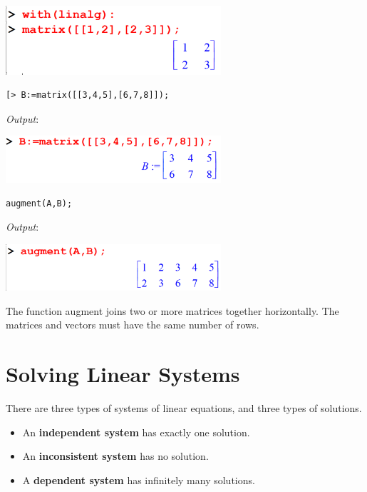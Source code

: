 \documentclass[
]{book}
\providecommand{\tightlist}{%
  \setlength{\itemsep}{0pt}\setlength{\parskip}{0pt}}
\theoremstyle{definition}
\theoremstyle{definition}
\theoremstyle{definition}
\theoremstyle{definition}
\theoremstyle{remark}
\begin{document}
\includegraphics[width=0.6\textwidth,height=\textheight]{figures/Lesson 5/fig1.png}

\begin{verbatim}
[> B:=matrix([[3,4,5],[6,7,8]]);
\end{verbatim}

\emph{Output}:

\includegraphics[width=0.6\textwidth,height=\textheight]{figures/Lesson 5/fig2.png}

\begin{verbatim}
augment(A,B);
\end{verbatim}

\emph{Output}:

\includegraphics[width=0.6\textwidth,height=\textheight]{figures/Lesson 5/fig3.png}

The function augment joins two or more matrices together horizontally.
The matrices and vectors must have the same number of rows.

\section{Solving Linear Systems}\label{solving-linear-systems}

There are three types of systems of linear equations, and three types of solutions.

\begin{itemize}
\tightlist
\item
  An \textbf{independent system} has exactly one solution.
\item
  An \textbf{inconsistent system} has no solution.
\item
  A \textbf{dependent system} has infinitely many solutions.
\end{itemize}
\end{document}
